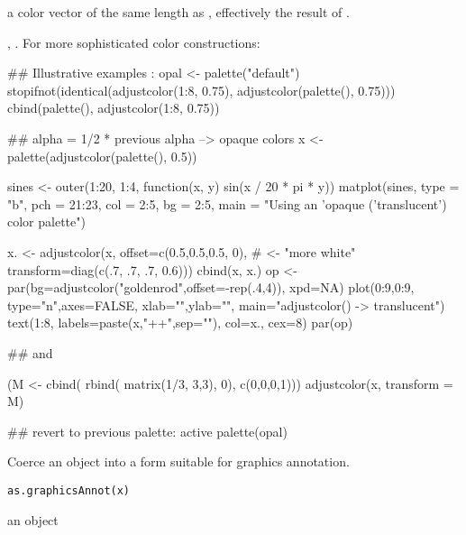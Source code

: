 %
\begin{Value}
a color vector of the same length as , effectively the
result of .
\end{Value}
%
\begin{SeeAlso}\relax
{}, .  For more sophisticated
color constructions: 
\end{SeeAlso}
%
\begin{Examples}
\begin{ExampleCode}
## Illustrative examples :
opal <- palette("default")
stopifnot(identical(adjustcolor(1:8,       0.75),
                    adjustcolor(palette(), 0.75)))
cbind(palette(), adjustcolor(1:8, 0.75))

##  alpha = 1/2 * previous alpha --> opaque colors
x <- palette(adjustcolor(palette(), 0.5))

sines <- outer(1:20, 1:4, function(x, y) sin(x / 20 * pi * y))
matplot(sines, type = "b", pch = 21:23, col = 2:5, bg = 2:5,
        main = "Using an 'opaque ('translucent') color palette")

x. <- adjustcolor(x, offset=c(0.5,0.5,0.5, 0), # <- "more white"
                  transform=diag(c(.7, .7, .7, 0.6)))
cbind(x, x.)
op <- par(bg=adjustcolor("goldenrod",offset=-rep(.4,4)), xpd=NA)
plot(0:9,0:9, type="n",axes=FALSE, xlab="",ylab="",
     main="adjustcolor() -> translucent")
text(1:8, labels=paste(x,"++",sep=""), col=x., cex=8)
par(op)

## and

(M <- cbind( rbind( matrix(1/3, 3,3), 0), c(0,0,0,1)))
adjustcolor(x, transform = M)

## revert to previous palette: active
palette(opal)
\end{ExampleCode}
\end{Examples}
%
\begin{Description}\relax
Coerce an \R{} object into a form suitable for graphics annotation.
\end{Description}
%
\begin{Usage}
\begin{verbatim}
as.graphicsAnnot(x)
\end{verbatim}
\end{Usage}
%
\begin{Arguments}
\begin{ldescription}
\item[\code{x}] an \R{} object
\end{ldescription}
\end{Arguments}
